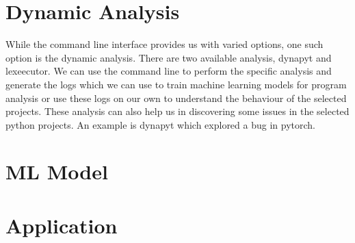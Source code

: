 \section{Dynamic Analysis}
\label{approach:dynamic analysis}
While the command line interface provides us with varied options, one such option is the dynamic analysis. There are two available analysis, dynapyt and lexeecutor. We can use the command line to perform the specific analysis and generate the logs which we can use to train machine learning models for program analysis or use these logs on our own to understand the behaviour of the selected projects. These analysis can also help us in discovering some issues in the selected python projects. An example is dynapyt which explored a bug in pytorch. 

\section{ML Model}
\label{approach:ml model}

\section{Application}
\label{approach:application}